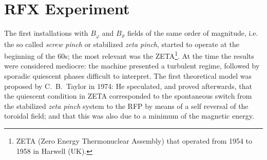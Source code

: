 \section{RFX Experiment}
The first installations with $B_\varphi$ and $B_\vartheta$ fields of the same order of magnitude, i.e. the so called \textit{screw pinch} or stabilized \textit{zeta pinch}, started to operate at the beginning of the 60s; the most relevant was the ZETA\footnote{ZETA (Zero Energy Thermonuclear Assembly) that operated from 1954 to 1958 in Harwell (UK).}. At the time the results were considered mediocre: the machine presented a turbulent regime, followed by sporadic quiescent phases difficult to interpret. The first theoretical model was proposed by C.~B.~Taylor in 1974\cite{taylor}: He speculated, and proved afterwards, that the quiescent condition in ZETA corresponded to the spontaneous switch from the stabilized \textit{zeta pinch} system to the RFP by means of a self reversal of the toroidal field; and that this was also due to a minimum of the magnetic energy.

